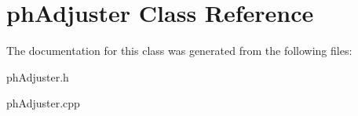 \hypertarget{classph_adjuster}{}\section{ph\+Adjuster Class Reference}
\label{classph_adjuster}


The documentation for this class was generated from the following files\+:\begin{DoxyCompactItemize}
\item 
ph\+Adjuster.\+h\item 
ph\+Adjuster.\+cpp\end{DoxyCompactItemize}

